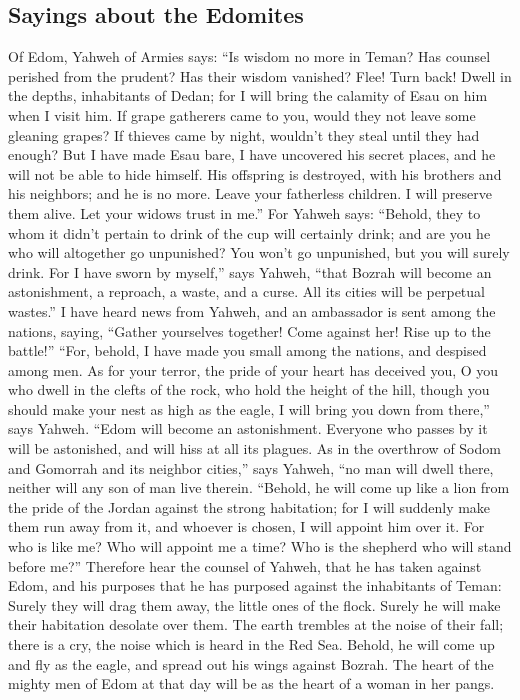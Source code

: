 \begin{paracol}{2}
\begin{otherlanguage}{english}
\hypertarget{sayings-about-the-edomites}{%
\subsection{Sayings about the
Edomites}\label{sayings-about-the-edomites}}

 Of Edom, Yahweh of Armies says: ``Is wisdom no more in
Teman? Has counsel perished from the prudent? Has their wisdom vanished?
 Flee! Turn back! Dwell in the depths, inhabitants of
Dedan; for I will bring the calamity of Esau on him when I visit him.
 If grape gatherers came to you, would they not leave some
gleaning grapes? If thieves came by night, wouldn't they steal until
they had enough?  But I have made Esau bare, I have
uncovered his secret places, and he will not be able to hide himself.
His offspring is destroyed, with his brothers and his neighbors; and he
is no more.  Leave your fatherless children. I will
preserve them alive. Let your widows trust in me.''  For
Yahweh says: ``Behold, they to whom it didn't pertain to drink of the
cup will certainly drink; and are you he who will altogether go
unpunished? You won't go unpunished, but you will surely drink.
 For I have sworn by myself,'' says Yahweh, ``that Bozrah
will become an astonishment, a reproach, a waste, and a curse. All its
cities will be perpetual wastes.''  I have heard news
from Yahweh, and an ambassador is sent among the nations, saying,
``Gather yourselves together! Come against her! Rise up to the battle!''
 ``For, behold, I have made you small among the nations,
and despised among men.  As for your terror, the pride of
your heart has deceived you, O you who dwell in the clefts of the rock,
who hold the height of the hill, though you should make your nest as
high as the eagle, I will bring you down from there,'' says Yahweh.
 ``Edom will become an astonishment. Everyone who passes
by it will be astonished, and will hiss at all its plagues.
 As in the overthrow of Sodom and Gomorrah and its
neighbor cities,'' says Yahweh, ``no man will dwell there, neither will
any son of man live therein.  ``Behold, he will come up
like a lion from the pride of the Jordan against the strong habitation;
for I will suddenly make them run away from it, and whoever is chosen, I
will appoint him over it. For who is like me? Who will appoint me a
time? Who is the shepherd who will stand before me?'' 
Therefore hear the counsel of Yahweh, that he has taken against Edom,
and his purposes that he has purposed against the inhabitants of Teman:
Surely they will drag them away, the little ones of the flock. Surely he
will make their habitation desolate over them.  The earth
trembles at the noise of their fall; there is a cry, the noise which is
heard in the Red Sea.  Behold, he will come up and fly as
the eagle, and spread out his wings against Bozrah. The heart of the
mighty men of Edom at that day will be as the heart of a woman in her
pangs.


\end{otherlanguage}
\end{paracol}
